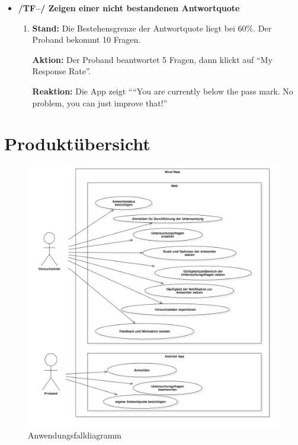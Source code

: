 \documentclass[a4paper]{scrreprt}
\begin{document}
\begin{itemize}
            \item \textbf{/TF--/ Zeigen einer nicht bestandenen \gls{Antwortquote}}
            \begin{enumerate}
                \item \par \textbf{Stand: }Die Bestehensgrenze der \gls{Antwortquote} liegt bei 60\%. Der \gls{Proband} bekommt 10 Fragen.
                \par \textbf{Aktion: }Der \gls{Proband} beantwortet 5 Fragen, dann klickt auf “My Response Rate”.
                \par \textbf{Reaktion: }Die App zeigt ““You are currently below the pass mark. No problem, you can just improve that!”
            \end{enumerate}

            \end{itemize}

    \chapter{Produktübersicht}
            \begin{figure}[htbp]
                \centering
                \includegraphics[scale = 0.4]{UseCaseDiagram1.jpg}
                \caption{Anwendungsfalldiagramm}
            \end{figure}


    \glsaddall
    \printglossary

    \listoffigures
\end{document}

